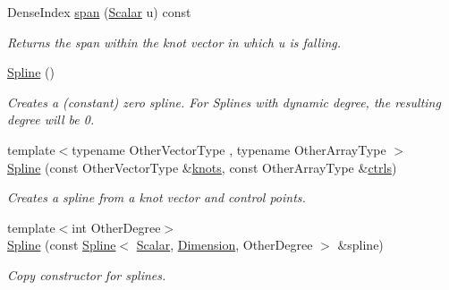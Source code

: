 \begin{DoxyCompactItemize}
Dense\+Index \hyperlink{group___splines___module_ab62751802b4cc237aadb0dbf3455df98}{span} (\hyperlink{group___splines___module_a8cafd78b564825c76fbb3419653d9742}{Scalar} u) const
\begin{DoxyCompactList}\small\item\em Returns the span within the knot vector in which u is falling. \end{DoxyCompactList}\item 
\mbox{\label{group___splines___module_a25ebf3b3621db98ffe60eba3c0d64025}} 
\hyperlink{group___splines___module_a25ebf3b3621db98ffe60eba3c0d64025}{Spline} ()
\begin{DoxyCompactList}\small\item\em Creates a (constant) zero spline. For Splines with dynamic degree, the resulting degree will be 0. \end{DoxyCompactList}\item 
{\footnotesize template$<$typename Other\+Vector\+Type , typename Other\+Array\+Type $>$ }\\\hyperlink{group___splines___module_ac9dfdbeabf9573642d970e29e92dd2be}{Spline} (const Other\+Vector\+Type \&\hyperlink{group___splines___module_ae3eac8af580ad880d8ad3a259d453aa1}{knots}, const Other\+Array\+Type \&\hyperlink{group___splines___module_a0fc81e475d3a0ba34da1bd97f2e8fbc7}{ctrls})
\begin{DoxyCompactList}\small\item\em Creates a spline from a knot vector and control points. \end{DoxyCompactList}\item 
{\footnotesize template$<$int Other\+Degree$>$ }\\\hyperlink{group___splines___module_a0e6083605acc9f565e8bf4057b3f4bd3}{Spline} (const \hyperlink{group___splines___module_class_eigen_1_1_spline}{Spline}$<$ \hyperlink{group___splines___module_a8cafd78b564825c76fbb3419653d9742}{Scalar}, \hyperlink{group___splines___module_a82c233f1d4719bc52397d64a6c96c5b0a25366e5e79da5355d259a71096d8d8a7}{Dimension}, Other\+Degree $>$ \&spline)
\begin{DoxyCompactList}\small\item\em Copy constructor for splines. \end{DoxyCompactList}\item 
\mbox{\label{group___splines___module_ae3eac8af580ad880d8ad3a259d453aa1}} 

\end{DoxyCompactItemize}
